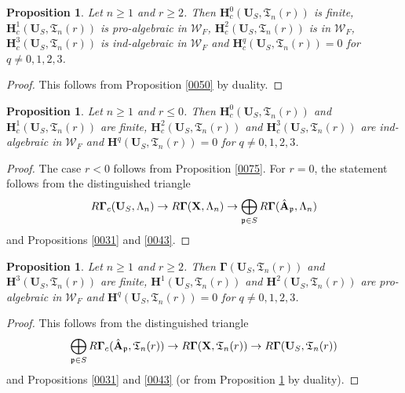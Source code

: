 \documentclass{amsart}
\newtheorem{Prop}[Thm]{Proposition}
\theoremstyle{remark}
\numberwithin{equation}{section}
\newcommand{\alg}[1]{\mathbf{#1}}
\newcommand{\ideal}[1]{\mathfrak{#1}}
\begin{document}
\begin{Prop}
	Let $n \ge 1$ and $r \ge 2$.
	Then $\alg{H}_{c}^{0}(\alg{U}_{S}, \mathfrak{T}_{n}(r))$ is finite,
	$\alg{H}^{1}_{c}(\alg{U}_{S}, \mathfrak{T}_{n}(r))$ is pro-algebraic in $\mathcal{W}_{F}$,
	$\alg{H}^{2}_{c}(\alg{U}_{S}, \mathfrak{T}_{n}(r))$ is in $\mathcal{W}_{F}$,
	$\alg{H}^{3}_{c}(\alg{U}_{S}, \mathfrak{T}_{n}(r))$ is ind-algebraic in $\mathcal{W}_{F}$
	and $\alg{H}^{q}_{c}(\alg{U}_{S}, \mathfrak{T}_{n}(r)) = 0$ for $q \ne 0, 1, 2, 3$.
\end{Prop}

\begin{proof}
	This follows from Proposition \ref{0050} by duality.
\end{proof}

\begin{Prop} \label{0051}
	Let $n \ge 1$ and $r \le 0$.
	Then $\alg{H}^{0}_{c}(\alg{U}_{S}, \mathfrak{T}_{n}(r))$ and
	$\alg{H}^{1}_{c}(\alg{U}_{S}, \mathfrak{T}_{n}(r))$ are finite,
	$\alg{H}^{2}_{c}(\alg{U}_{S}, \mathfrak{T}_{n}(r))$ and
	$\alg{H}^{3}_{c}(\alg{U}_{S}, \mathfrak{T}_{n}(r))$ are ind-algebraic in $\mathcal{W}_{F}$
	and $\alg{H}^{q}(\alg{U}_{S}, \mathfrak{T}_{n}(r)) = 0$ for $q \ne 0, 1, 2, 3$.
\end{Prop}

\begin{proof}
	The case $r < 0$ follows from Proposition \ref{0075}.
	For $r = 0$, the statement follows from the distinguished triangle
		\[
				R \alg{\Gamma}_{c}(\alg{U}_{S}, \Lambda_{n})
			\to
				R \alg{\Gamma}(\alg{X}, \Lambda_{n})
			\to
				\bigoplus_{\ideal{p} \in S}
					R \alg{\Gamma}(\Hat{\alg{A}}_{\ideal{p}}, \Lambda_{n})
		\]
	and Propositions \ref{0031} and \ref{0043}.
\end{proof}

\begin{Prop}
	Let $n \ge 1$ and $r \ge 2$.
	Then $\alg{\Gamma}(\alg{U}_{S}, \mathfrak{T}_{n}(r))$ and
	$\alg{H}^{3}(\alg{U}_{S}, \mathfrak{T}_{n}(r))$ are finite,
	$\alg{H}^{1}(\alg{U}_{S}, \mathfrak{T}_{n}(r))$ and
	$\alg{H}^{2}(\alg{U}_{S}, \mathfrak{T}_{n}(r))$ are pro-algebraic in $\mathcal{W}_{F}$ and
	$\alg{H}^{q}(\alg{U}_{S}, \mathfrak{T}_{n}(r)) = 0$ for $q \ne 0, 1, 2, 3$.
\end{Prop}

\begin{proof}
	This follows from the distinguished triangle
		\[
				\bigoplus_{\ideal{p} \in S}
					R \alg{\Gamma}_{c}(\Hat{\alg{A}}_{\ideal{p}}, \mathfrak{T}_{n}(r))
			\to
				R \alg{\Gamma}(\alg{X}, \mathfrak{T}_{n}(r))
			\to
				R \alg{\Gamma}(\alg{U}_{S}, \mathfrak{T}_{n}(r))
		\]
	and Propositions \ref{0031} and \ref{0043}
	(or from Proposition \ref{0051} by duality).
\end{proof}
\end{document}
